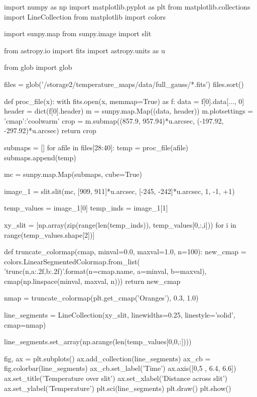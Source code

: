 \documentclass{emulateapj}
\begin{document}
\begin{pycode}
import numpy as np
import matplotlib.pyplot as plt
from matplotlib.collections import LineCollection
from matplotlib import colors

import sunpy.map
from sunpy.image import slit

from astropy.io import fits
import astropy.units as u

from glob import glob

files = glob('/storage2/temperature_maps/data/full_gauss/*.fits')
files.sort()




def proc_file(x):
    with fits.open(x, memmap=True) as f:
        data = f[0].data[..., 0]
        header = dict(f[0].header)
        m = sunpy.map.Map((data, header))
        m.plotsettings = {'cmap':'coolwarm'}
        crop = m.submap((857.9, 957.94)*u.arcsec,
                 (-197.92, -297.92)*u.arcsec)
    return crop 


submaps = []
for afile in files[28:40]:
    temp = proc_file(afile)
    submaps.append(temp)

mc = sunpy.map.Map(submaps, cube=True)


image_1 = slit.slit(mc, [909, 911]*u.arcsec, [-245, -242]*u.arcsec, 1, -1, +1)

temp_values = image_1[0]
temp_inds = image_1[1]


xy_slit = [np.array(zip(range(len(temp_inds)), temp_values[0,:,i])) for i in range(temp_values.shape[2])]

def truncate_colormap(cmap, minval=0.0, maxval=1.0, n=100):
    new_cmap = colors.LinearSegmentedColormap.from_list(
        'trunc({n},{a:.2f},{b:.2f})'.format(n=cmap.name, a=minval, b=maxval),
        cmap(np.linspace(minval, maxval, n)))
    return new_cmap

nmap = truncate_colormap(plt.get_cmap('Oranges'), 0.3, 1.0)

line_segments = LineCollection(xy_slit,
                               linewidths=0.25,
                               linestyle='solid',
                               cmap=nmap)

line_segments.set_array(np.arange(len(temp_values[0,0,:])))

fig, ax = plt.subplots()
ax.add_collection(line_segments)
ax_cb = fig.colorbar(line_segments)
ax_cb.set_label('Time')
ax.axis([0,5 , 6.4, 6.6])
ax.set_title('Temperature over slit')
ax.set_xlabel('Distance across slit')
ax.set_ylabel('Temperature')
plt.sci(line_segments)
plt.draw()
plt.show()

\end{pycode}
\end{document}
